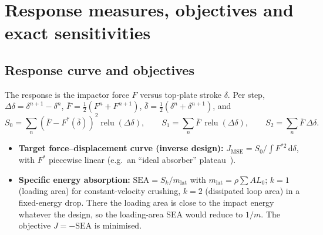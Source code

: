 \documentclass[11pt,a4paper]{article}
\newcommand{\dd}{\,\mathrm{d}}
\newcommand{\relu}{\operatorname{relu}}
\begin{document}
\section{Response measures, objectives and exact sensitivities}
\label{sec:sens}
\subsection{Response curve and objectives}
The response is the impactor force $F$ versus top-plate stroke $\delta$. Per step,
$\Delta\delta = \delta^{n+1}-\delta^n$, $\bar F = \tfrac12(F^n+F^{n+1})$, $\bar\delta = \tfrac12(\delta^n+\delta^{n+1})$, and
\begin{equation}
S_0 = \sum_n \left(\bar F - F^*(\bar\delta)\right)^2\relu(\Delta\delta),\qquad
S_1 = \sum_n \bar F\,\relu(\Delta\delta),\qquad S_2 = \sum_n \bar F\,\Delta\delta .
\end{equation}
\begin{itemize}
\item \textbf{Target force--displacement curve (inverse design):}
$J_\mathrm{MSE} = S_0 \big/ \int F^{*2}\dd\delta$, with $F^*$ piecewise linear (e.g.\ an ``ideal absorber''
plateau~\cite{zeng2023}).
\item \textbf{Specific energy absorption:} $\mathrm{SEA} = S_k/m_\mathrm{lat}$ with
$m_\mathrm{lat} = \rho\sum A L_0$; $k=1$ (loading area) for constant-velocity crushing, $k=2$ (dissipated loop
area) in a fixed-energy drop. There the loading area is close to the impact energy whatever the design, so the
loading-area SEA would reduce to $1/m$. The objective $J = -\mathrm{SEA}$ is minimised.
\end{itemize}
\end{document}
